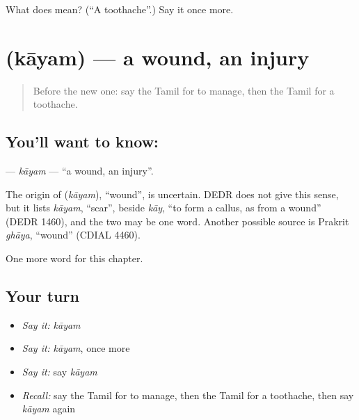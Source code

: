 \begin{tcolorbox}[breakable,colback=teal!4,colframe=teal!35!black,title={Before you move on}]
What does  mean? (\textquotedblleft{}A toothache\textquotedblright{}.) Say it once more.
\end{tcolorbox}
\section[\texorpdfstring{\ta{காயம்} (kāyam)}{காயம் (kāyam)}]{ (kāyam) — a wound, an injury}

\label{lesson:TA-C232-kayam}



\begin{quote}
Before the new one: say the Tamil for to manage, then the Tamil for a toothache.
\end{quote}

\subsection*{You'll want to know: }
\textbf{} — \emph{kāyam} — \textquotedblleft{}a wound, an injury\textquotedblright{}.

\begin{cousinweb}
The origin of \textbf{} (\emph{kāyam}), \textquotedblleft{}wound\textquotedblright{}, is uncertain. DEDR does not give this sense, but it lists \emph{kāyam}, \textquotedblleft{}scar\textquotedblright{}, beside \emph{kāy}, \textquotedblleft{}to form a callus, as from a wound\textquotedblright{} (DEDR 1460), and the two may be one word. Another possible source is Prakrit \emph{ghāya}, \textquotedblleft{}wound\textquotedblright{} (CDIAL 4460).
\end{cousinweb}

\begin{grammarlens}[title={What you've built}]
One more word for this chapter.
\end{grammarlens}

\subsection*{Your turn}
\begin{itemize}
\raggedright
  \item \emph{Say it:} \emph{kāyam}
  \item \emph{Say it:} \emph{kāyam}, once more
  \item \emph{Say it:} say \emph{kāyam}
  \item \emph{Recall:} say the Tamil for to manage, then the Tamil for a toothache, then say \emph{kāyam} again
\end{itemize}

